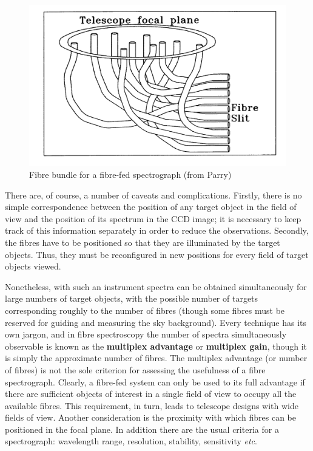 \documentclass[twoside,11pt]{starlink}
\begin{document}
\begin{figure}[htbp]
   \centering
   \includegraphics[totalheight=4in]{sc14_bundle}
   \caption[Fibre bundle for a fibre-fed spectrograph]{Fibre bundle
    for a fibre-fed spectrograph (from Parry\cite{PARRY97, PARRY98})
   \label{BUNDLE} }
\end{figure}

There are, of course, a number of caveats and complications.  Firstly,
there is no simple correspondence between the position of any target
object in the field of view and the position of its spectrum
in the CCD image; it is necessary to keep track of this information
separately in order to reduce the observations.  Secondly, the fibres
have to be positioned so that they are illuminated by the target
objects.  Thus, they must be reconfigured in new positions for every
field of target objects viewed.

Nonetheless, with such an instrument spectra can be obtained
simultaneously for large numbers of target objects, with the possible number
of targets corresponding roughly to the number of fibres (though some
fibres must be reserved for guiding and measuring the sky background).
Every technique has its own jargon, and in fibre spectroscopy the number
of spectra simultaneously observable is known as the \textbf{multiplex
advantage} or \textbf{multiplex gain}, though it is simply the approximate
number of fibres.  The multiplex advantage (or number of fibres) is not
the sole criterion for assessing the usefulness of a fibre spectrograph.
Clearly, a fibre-fed system can only be used to its full advantage if
there are sufficient objects of interest in a single field of view to
occupy all the available fibres.  This requirement, in turn, leads to
telescope designs with wide fields of view.  Another consideration is
the proximity with which fibres can be positioned in the focal plane.
In addition there are the usual criteria for a spectrograph: wavelength
range, resolution, stability, sensitivity \emph{etc}.
\end{document}
